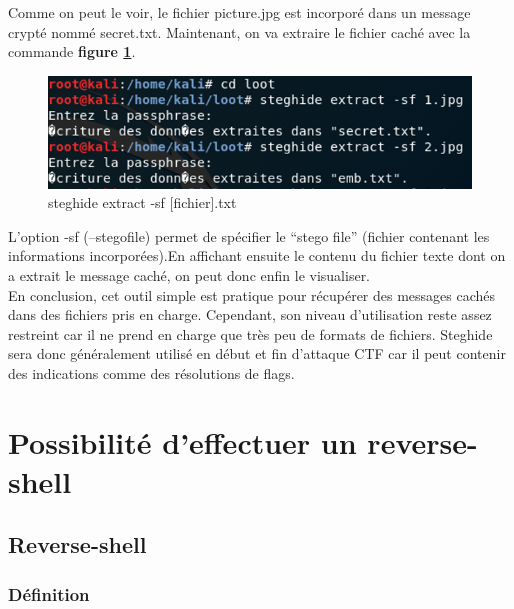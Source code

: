 Comme on peut le voir, le fichier picture.jpg est incorporé dans un message crypté nommé secret.txt.
Maintenant, on va extraire le fichier caché avec la commande \textbf{figure \ref{fig:steghideextract}}.

\begin{figure}[htp!]
  \centering
  \setlength\figureheight{7cm}
  \setlength\figurewidth{9cm}
  \includegraphics[width=1\textwidth]{oui/Ancien/imangeancien/steghide/STG1.png}
  \caption{steghide extract -sf [fichier].txt}
  \label{fig:steghideextract}
\end{figure}

\vspace{4cm}
L’option -sf (--stegofile) permet de spécifier le “stego file” (fichier contenant les informations incorporées).En affichant ensuite le contenu du fichier texte dont on a extrait le message caché, on peut donc enfin le visualiser. \\

En conclusion, cet outil simple est pratique pour récupérer des messages cachés dans des fichiers pris en charge. Cependant, son niveau d’utilisation reste assez restreint car il ne prend en charge que très peu de formats de fichiers. Steghide sera donc généralement utilisé en début et fin d’attaque CTF car il peut contenir des indications comme des résolutions de flags.


\section{Possibilité d'effectuer un reverse-shell}

\subsection{Reverse-shell}

\subsubsection{Définition}

